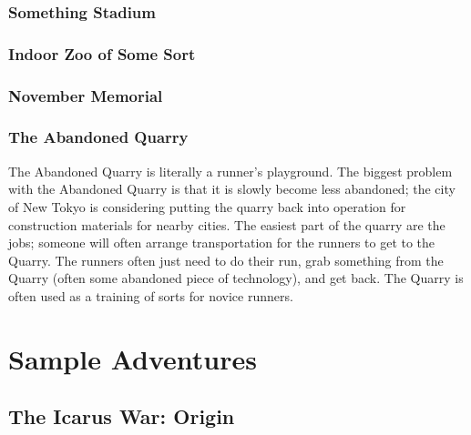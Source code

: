 \documentclass{article}
\begin{document}
\subsubsection{Something Stadium}
\subsubsection{Indoor Zoo of Some Sort}
\subsubsection{November Memorial}
\subsubsection{The Abandoned Quarry}
The Abandoned Quarry is literally a runner’s playground. The biggest problem
with the Abandoned Quarry is that it is slowly become less abandoned; the city of New Tokyo is considering putting the quarry back into operation for construction materials for nearby cities. The easiest part of the quarry are the jobs; someone will often arrange transportation for the runners to get to the Quarry. The runners often just need to do their run, grab something from the Quarry (often some abandoned piece of technology), and get back. The Quarry is often used as a training of sorts for novice runners.
\section{Sample Adventures}
\subsection{The Icarus War: Origin}
\end{document}
